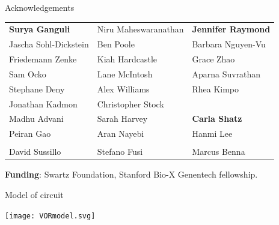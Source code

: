 \documentclass[final]{beamer}%
\begin{document}

\begin{frame}{Acknowledgements}
%
\begin{tabular}{lll}
  \textbf{Surya Ganguli} & Niru Maheswaranathan & \textbf{Jennifer Raymond} \\
  Jascha Sohl-Dickstein  & Ben Poole            & \alert{Barbara Nguyen-Vu} \\
  Friedemann Zenke       & Kiah Hardcastle      & \alert{Grace Zhao}        \\
  Sam Ocko               & Lane McIntosh        & Aparna Suvrathan          \\
  Stephane Deny          & Alex Williams        & Rhea Kimpo                \\
  Jonathan Kadmon        & Christopher Stock    \\
  Madhu Advani           & Sarah Harvey         & \textbf{Carla Shatz}      \\
  Peiran Gao             & Aran Nayebi          & Hanmi Lee                 \\
  \\
  David Sussillo         & Stefano Fusi         & Marcus Benna    \\
\end{tabular}

 \vp\textbf{Funding}: Swartz Foundation, Stanford Bio-X Genentech fellowship.

%
\end{frame}

\appendix


\begin{frame}{Model of circuit}
%
 \begin{center}
   \texttt{[image: VORmodel.svg]}
 \end{center}
%
\end{frame}
\end{document}
